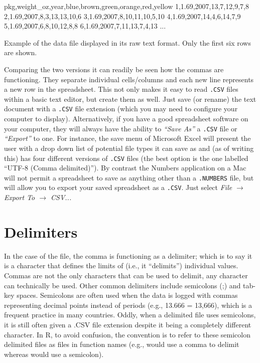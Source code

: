 \vspace{1em}
\begin{listing}[H]
\begin{raw}
pkg,weight_oz,year,blue,brown,green,orange,red,yellow
1,1.69,2007,13,7,12,9,7,8
2,1.69,2007,8,3,13,13,10,6
3,1.69,2007,8,10,11,10,5,10
4,1.69,2007,14,4,6,14,7,9
5,1.69,2007,6,8,10,12,8,8
6,1.69,2007,7,11,13,7,4,13
...
\end{raw}
\caption*{Example of the  data file displayed in its raw text format. Only the first six rows are shown.}
\end{listing}

\vspace{1em}

Comparing the two versions it can readily be seen how the commas are functioning. They separate individual cells/columns and each new line represents a new row in the spreadsheet. This not only makes it easy to read \texttt{.CSV} files within a basic text editor, but create them as well. Just save (or rename) the text document with a \texttt{.CSV} file extension (which you may need to configure your computer to display). Alternatively, if you have a good spreadsheet software on your computer, they will always have the ability to \textit{``Save As''} a \texttt{.CSV} file or \textit{``Export''} to one. For instance, the save menu of Microsoft Excel will present the user with a drop down list of potential file types it can save as and (as of writing this) has four different versions of \texttt{.CSV} files (the best option is the one labelled ``UTF-8 (Comma delimited)''). By contrast the Numbers application on a Mac will not permit a spreadsheet to save as anything other than a \texttt{.NUMBERS} file, but will allow you to export your saved spreadsheet as a \texttt{.CSV}. Just select \textit{File $\rightarrow$ Export To $\rightarrow$ CSV... }

\section{Delimiters}

In the case of the  file, the comma is functioning as a \gls{delimiter}; which is to say it is a character that defines the limits of (i.e., it ``delimits'') individual values. Commas are not the only characters that can be used to delimit, any character can technically be used. Other common delimiters include semicolons (;) and tab-key spaces. Semicolons are often used when the data is logged with commas representing decimal points instead of periods (e.g., 13.666 = 13,666), which is a frequent practice in many countries. Oddly, when a delimited file uses semicolons, it is still often given a .CSV file extension despite it being a completely different character.  In R, to avoid confusion, the convention is to refer to these semicolon delimited files as  files in function names (e.g.,  would use a comma to delimit whereas  would use a semicolon).

